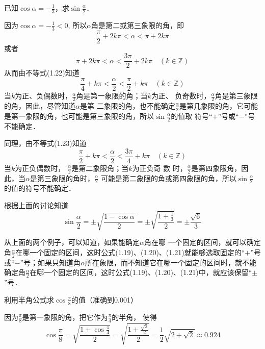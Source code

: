 \begin{example}
    已知$\cos\alpha=-\frac{1}{3}$，求$\sin\frac{\alpha}{2}$．
\end{example}

\begin{solution}
因为$\cos\alpha=-\frac{1}{3}<0$, 所以$\alpha$角是第二或第三象限的角，即
\begin{equation}
    \frac{\pi}{2}+2k\pi<\alpha<\pi+2k\pi
\end{equation}
或者
\begin{equation}
    \pi+2k\pi<\alpha<\frac{3\pi}{2}+2k\pi\quad (k\in\mathbb{Z})
\end{equation}
从而由不等式(1.22)知道
\[\frac{\pi}{4}+k\pi<\frac{\alpha}{2}<\frac{\pi}{2}+k\pi \quad (k\in\mathbb{Z}) \]
当$k$为正、负偶数时，$\frac{\alpha}{2}$角是第一象限的角；当$k$为正、
负奇数时，$\frac{\alpha}{2}$角是第三象限的角，因此，尽管知道$\alpha$是第
二象限的角，也不能确定$\frac{\alpha}{2}$是第几象限的角，它可能是第一象限的角，也可能是第三象限的角，所以$\sin \frac{\alpha}{2}$的值取
符号“$+$”号或“$-$”号不能确定．

同理，由不等式(1.23)知道
\[\frac{\pi}{2}+k\pi<\frac{\alpha}{2}<\frac{3\pi}{4}+k\pi\quad (k\in\mathbb{Z})\]
当$k$为正负偶数时，
$\frac{\alpha}{2}$是第二象限角；当$k$为正负奇 数
时，$\frac{\alpha}{2}$是第四象限角，因此，当$\alpha$是第三象限的角时，$\frac{\alpha}{2}$
可能是第二象限的角或第四象限的角，所以$\sin\frac{\alpha}{2}$
的值的符号不能确定．

根据上面的讨论知道
\[\sin\frac{\alpha}{2}=\pm\sqrt{\frac{1-\cos\alpha}{2}}=\pm\sqrt{\frac{1+\frac{1}{3}}{2}}=\pm\frac{\sqrt{6}}{3}\]
\end{solution}

从上面的两个例子，可以知道，如果能确定$\alpha$角在哪
一个固定的区间，就可以确定角$\frac{\alpha}{2}$在哪一个固定的区间，这时公式(1.19)、(1.20)、(1.21)就能够选取固定的“$+$”号或“$-$”号；如果只知道角$\alpha$所在象限，而不知道它在哪一个固定的区间时，就不能确定角$\frac{\alpha}{2}$在哪一个固定的区间，这时公式(1.19)、(1.20)、(1.21)中，就应该保留“$\pm$”号．
    

\begin{example}
    利用半角公式求$\cos\frac{\pi}{8}$的值（准确到0.001）
\end{example}

\begin{solution}
    因为$\frac{\pi}{8}$是第一象限的角，把它作为$\frac{\pi}{4}$的半角，
    使得
\[\cos\frac{\pi}{8}=\sqrt{\frac{1+\cos\frac{\pi}{4}}{2}}=\sqrt{\frac{1+\frac{\sqrt{2}}{2}}{2}}=\frac{1}{2}\sqrt{2+\sqrt{2}}\approx 0.924\]
\end{solution}


